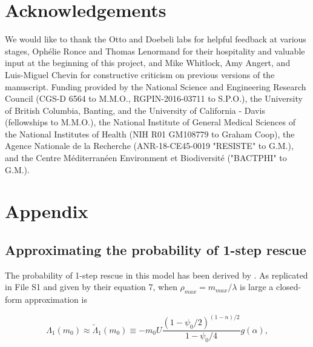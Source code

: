\documentclass[9pt,twocolumn,twoside,lineno]{gsajnl}
\begin{document}
\section{Acknowledgements}

We would like to thank the Otto and Doebeli labs for helpful feedback at various stages, Oph\'{e}lie Ronce and Thomas Lenormand for their hospitality and valuable input at the beginning of this project, and Mike Whitlock, Amy Angert, and Luis-Miguel Chevin for constructive criticism on previous versions of the manuscript.
Funding provided by the National Science and Engineering Research Council (CGS-D 6564 to M.M.O., RGPIN-2016-03711 to S.P.O.), the University of British Columbia, Banting, and the University of California - Davis (fellowships to M.M.O.), the National Institute of General Medical Sciences of the National Institutes of Health (NIH R01 GM108779 to Graham Coop), the Agence Nationale de la Recherche (ANR-18-CE45-0019 "RESISTE" to G.M.), and the Centre M\'{e}diterran\'{e}en Environment et Biodiversit\'{e} ("BACTPHI" to G.M.).



\section{Appendix}
\label{sec:appendix}

\subsection{Approximating the probability of 1-step rescue}
\label{subsec:1stepApproximations}

The probability of 1-step rescue in this model has been derived by \cite{Anciaux2018}.
As replicated in File S1 and given by their equation 7, when $\rho_{max} = m_{max}/\lambda$ is large a closed-form approximation is

\begin{equation}\label{eq:p1closed}
\Lambda_1(m_0) \approx \tilde{\Lambda}_1(m_0) \equiv  -m_0 U \frac{(1-\psi_0/2)^{(1-n)/2}}{1-\psi_0/4} g(\alpha),
\end{equation}
\end{document}
